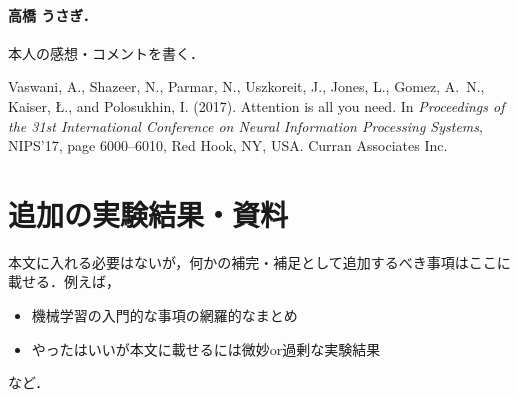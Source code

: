 \documentclass[a4paper,11pt]{article}
\begin{document}
\paragraph{高橋 うさぎ．}本人の感想・コメントを書く．

\clearpage

\begin{thebibliography}{}

Vaswani, A., Shazeer, N., Parmar, N., Uszkoreit, J., Jones, L., Gomez, A.~N., Kaiser, {\L}., and Polosukhin, I. (2017).
\newblock Attention is all you need.
\newblock In {\em Proceedings of the 31st International Conference on Neural Information Processing Systems}, NIPS'17, page 6000–6010, Red Hook, NY, USA. Curran Associates Inc.
\end{thebibliography}



\clearpage
\appendix
\renewcommand{\thesection}{補遺\Alph{section}}
\section{追加の実験結果・資料}
本文に入れる必要はないが，何かの補完・補足として追加するべき事項はここに載せる．例えば，
\begin{itemize}
    \item 機械学習の入門的な事項の網羅的なまとめ
    \item やったはいいが本文に載せるには微妙or過剰な実験結果
\end{itemize}
など．
\end{document}
